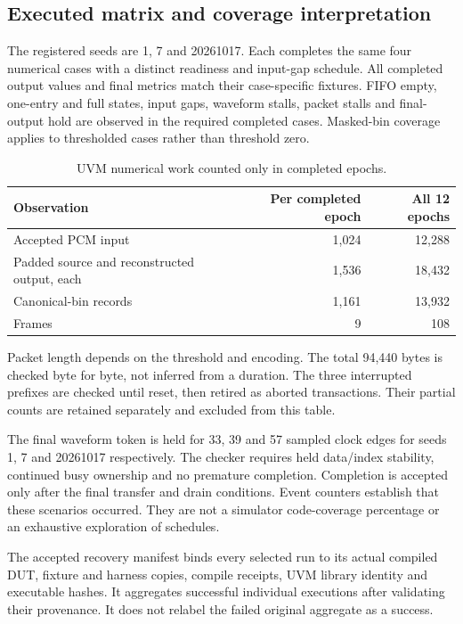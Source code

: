 \subsection{Executed matrix and coverage interpretation}
The registered seeds are 1, 7 and 20261017. Each completes the same four numerical cases with a distinct readiness and input-gap schedule. All completed output values and final metrics match their case-specific fixtures. FIFO empty, one-entry and full states, input gaps, waveform stalls, packet stalls and final-output hold are observed in the required completed cases. Masked-bin coverage applies to thresholded cases rather than threshold zero.

\begin{table}[htbp]\centering
\caption{UVM numerical work counted only in completed epochs.}
\begin{tabular}{lrr}\toprule
Observation & Per completed epoch & All 12 epochs\\\midrule
Accepted PCM input & 1,024 & 12,288\\
Padded source and reconstructed output, each & 1,536 & 18,432\\
Canonical-bin records & 1,161 & 13,932\\
Frames & 9 & 108\\\bottomrule
\end{tabular}\end{table}
Packet length depends on the threshold and encoding. The total 94,440 bytes is checked byte for byte, not inferred from a duration. The three interrupted prefixes are checked until reset, then retired as aborted transactions. Their partial counts are retained separately and excluded from this table.

The final waveform token is held for 33, 39 and 57 sampled clock edges for seeds 1, 7 and 20261017 respectively. The checker requires held data/index stability, continued busy ownership and no premature completion. Completion is accepted only after the final transfer and drain conditions. Event counters establish that these scenarios occurred. They are not a simulator code-coverage percentage or an exhaustive exploration of schedules.

The accepted recovery manifest binds every selected run to its actual compiled DUT, fixture and harness copies, compile receipts, UVM library identity and executable hashes. It aggregates successful individual executions after validating their provenance. It does not relabel the failed original aggregate as a success.
